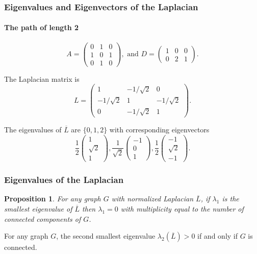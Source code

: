 \documentclass[aspectratio=43,leqno]{beamer}
\newtheorem{proposition}[theorem]{Proposition}
\begin{document}
\begin{frame}
    \frametitle{Eigenvalues and Eigenvectors of the Laplacian}
    \framesubtitle{The path of length 2}

\begin{displaymath}
  A = \begin{pmatrix} 0 & 1 & 0 \\ 1 & 0 & 1 \\ 0 & 1 & 0 \end{pmatrix},
  \text{ and }
  D = \begin{pmatrix} 1 & 0 & 0 \\ 0 & 2 & 1 \end{pmatrix}.
\end{displaymath}
\pause

The Laplacian matrix is 
\begin{displaymath}
L = \begin{pmatrix} 1 & -1/\sqrt{2} & 0 \\ -1/\sqrt{2} & 1 & -1/\sqrt{2} \\ 0 & -1/\sqrt{2} & 1 \end{pmatrix}.
\end{displaymath}
\pause

The eigenvalues of $\overline{L}$ are $\{ 0, 1, 2 \}$ with corresponding eigenvectors 
\begin{displaymath}
  \frac{1}{2} \begin{pmatrix} 1 \\ \sqrt{2} \\ 1 \end{pmatrix}, \frac{1}{\sqrt{2}} \begin{pmatrix} -1 \\ 0 \\ 1 \end{pmatrix}, \frac{1}{2} \begin{pmatrix} -1 \\ \sqrt{2} \\ -1 \end{pmatrix}.
\end{displaymath}

\end{frame}

\begin{frame}
    \frametitle{Eigenvalues of the Laplacian}

\begin{proposition}
For any graph $G$ with normalized Laplacian $\overline{L}$, if $\lambda_1$ is the smallest eigenvalue of $\overline{L}$ then $\lambda_1 = 0$ with multiplicity equal to the number of connected components of $G$.
\end{proposition}
\pause

\begin{corollary}
For any graph $G$, the second smallest eigenvalue $\lambda_2(\overline{L})>0$ if and only if $G$ is connected.
\end{corollary}
\end{frame}
\end{document}
